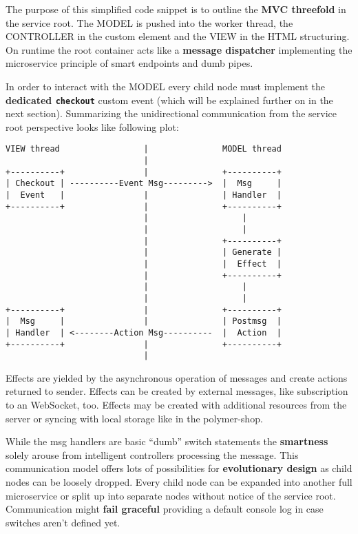 \documentclass[]{article}
\begin{document}
The purpose of this simplified code snippet is to outline the
\textbf{MVC threefold} in the service root. The MODEL is pushed into the
worker thread, the CONTROLLER in the custom element and the VIEW in the
HTML structuring. On runtime the root container acts like a
\textbf{message dispatcher} implementing the microservice principle of
smart endpoints and dumb pipes.

In order to interact with the MODEL every child node must implement the
\textbf{dedicated \texttt{checkout}} custom event (which will be
explained further on in the next section). Summarizing the
unidirectional communication from the service root perspective looks
like following plot:

\begin{verbatim}
VIEW thread                 |               MODEL thread
                            |
+----------+                |               +----------+
| Checkout | ----------Event Msg--------->  |  Msg     |
|  Event   |                |               | Handler  |
+----------+                |               +----------+
                            |                   |
                            |                   |
                            |               +----------+
                            |               | Generate |
                            |               |  Effect  |
                            |               +----------+
                            |                   |
                            |                   |
+----------+                |               +----------+
|  Msg     |                |               | Postmsg  |
| Handler  | <--------Action Msg----------  |  Action  |
+----------+                |               +----------+    
                            |
\end{verbatim}

Effects are yielded by the asynchronous operation of messages and create
actions returned to sender. Effects can be created by external messages,
like subscription to an WebSocket, too. Effects may be created with
additional resources from the server or syncing with local storage like
in the polymer-shop.

While the msg handlers are basic ``dumb'' switch statements the
\textbf{smartness} solely arouse from intelligent controllers processing
the message. This communication model offers lots of possibilities for
\textbf{evolutionary design} as child nodes can be loosely dropped.
Every child node can be expanded into another full microservice or split
up into separate nodes without notice of the service root. Communication
might \textbf{fail graceful} providing a default console log in case
switches aren't defined yet.
\end{document}
